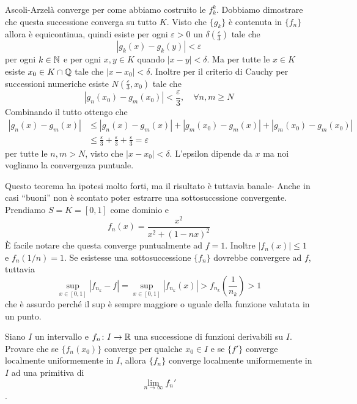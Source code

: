 \documentclass[a4paper]{article}
\begin{document}
\begin{snippetproof}{Ascoli-Arzelà}
    converge per come abbiamo costruito
    le \(f_k^k\). Dobbiamo dimostrare che questa successione converga su tutto \(K\).
    Visto che \(\{g_k\}\)
    è contenuta in \(\{f_n\}\)
    allora è equicontinua, quindi esiste per ogni \(\varepsilon > 0\) un \(\delta\left(\frac{\varepsilon}{3}\right)\)
    tale che \[ |g_k(x) - g_k(y)| < \varepsilon\]
    per ogni \(k \in \mathbb{N}\) e per ogni \(x,y \in K\)
    quando \(|x-y| < \delta\).
    Ma per tutte le \(x \in K\) esiste \(x_0 \in K \cap \mathbb{Q}\)
    tale che \(|x-x_0| < \delta\).
    Inoltre per il criterio di Cauchy per successioni numeriche esiste \(N\left(\frac{\varepsilon}{3}, x_0\right)\)
    tale che \[
        |g_n(x_0)- g_m(x_0)| < \frac{\varepsilon}{3}, \quad \forall n,m \geq N
    \]
    Combinando il tutto ottengo che
    \begin{align*}
        |g_n(x) - g_m(x)| &\leq |g_n(x) - g_m(x)| + |g_m(x_0) - g_m(x)| + |g_m(x_0) - g_m(x_0)| \\
        &\leq \frac{\varepsilon}{3} + \frac{\varepsilon}{3} + \frac{\varepsilon}{3} = \varepsilon
    \end{align*}
    per tutte le \(n,m > N\), visto che \(|x-x_0| < \delta\).
    L'epsilon dipende da \(x\) ma noi vogliamo la convergenza puntuale.
\end{snippetproof}

\begin{snippetexample}{}
    Questo teorema ha ipotesi molto forti,
    ma il risultato è tuttavia banale-
    Anche in casi ``buoni'' non è scontato poter estrarre una sottosuccssione convergente.
    Prendiamo \(S = K = [0,1]\) come dominio e
    \[
        f_n(x) = \frac{x^2}{x^2 + (1-nx)^2}
    \]
    È facile notare che questa converge puntualmente ad \(f=1\).
    Inoltre \(|f_n(x)| \leq 1\)
    e \(f_n(1/n) = 1\).
    Se esistesse una sottosuccessione
    \(\{f_n\}\) dovrebbe convergere ad \(f\), tuttavia
    \[
        \sup_{x \in [0,1]} |f_{n_k} - f| = \sup_{x \in [0,1]}
        |f_{n_k}(x)| > f_{n_k}(\frac{1}{n_k}) > 1
    \]
    che è assurdo perché il sup è sempre maggiore o uguale della funzione valutata in un punto.
\end{snippetexample}

\begin{snippetexercise}{}
    Siano \(I\) un intervallo e \(f_n\colon I \to \mathbb{R}\) una successione di funzioni derivabili su \(I\). Provare che
    se \(\{f_n(x_0)\}\) converge per qualche \(x_0 \in I\) e se \(\{f'\}\) converge localmente uniformemente in \(I\),
    allora \(\{f_n\}\) converge localmente uniformemente in \(I\) ad una primitiva di \[\lim_{n\to \infty} f_n'\].
\end{snippetexercise}
\end{document}
